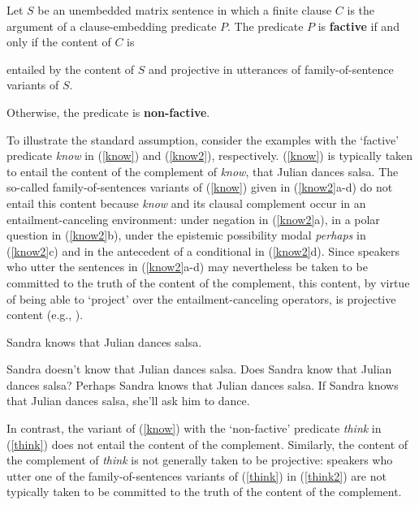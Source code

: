 \documentclass[11pt,fleqn]{article}
\newcommand{\6}{\mbox{$[\hspace*{-.6mm}[$}}
\newcommand{\9}{\mbox{$]\hspace*{-.6mm}]$}}
\begin{document}
\begin{exe}
\ex\label{def} Let $S$ be an unembedded matrix sentence in which a finite clause $C$ is the argument of a clause-embedding predicate $P$. The predicate $P$ is {\bf factive} if and only if the content of $C$ is

\begin{xlist}
\ex entailed by the content of $S$ and
\ex projective in utterances of family-of-sentence variants of $S$.
\end{xlist}
Otherwise, the predicate is {\bf non-factive}.
\end{exe}

To illustrate the standard assumption, consider the examples with the `factive' predicate {\em know} in  (\ref{know}) and (\ref{know2}), respectively. (\ref{know}) is typically taken to entail the content of the complement of {\em know}, that Julian dances salsa. The so-called family-of-sentences variants of (\ref{know}) given in (\ref{know2}a-d) do not entail this content because {\em know} and its clausal complement occur in an entailment-canceling environment: under negation in (\ref{know2}a), in a polar question in (\ref{know2}b), under the epistemic possibility modal {\em perhaps} in (\ref{know2}c) and in the antecedent of a conditional in (\ref{know2}d). Since speakers who utter the sentences in (\ref{know2}a-d) may nevertheless be taken to be committed to the truth of the content of the complement, this content, by virtue of being able to `project' over the entailment-canceling operators, is projective content (e.g., \citealt{potts05,brst-salt10}). 

\begin{exe}

\ex\label{know} Sandra knows that Julian dances salsa.

\ex\label{know2} 

\begin{xlist} 
\ex Sandra doesn't know that Julian dances salsa. 
\ex Does Sandra know that Julian dances salsa?
\ex Perhaps Sandra knows that Julian dances salsa.
\ex If Sandra knows that Julian dances salsa, she'll ask him to dance. 
\end{xlist}

\end{exe}

In contrast, the variant of (\ref{know}) with the `non-factive' predicate {\em think} in (\ref{think}) does not entail the content of the complement.  Similarly, the content of the complement of {\em think} is not generally taken to be projective: speakers who utter one of the family-of-sentences variants of (\ref{think}) in (\ref{think2}) are not typically taken to be committed to the truth of the content of the complement. 
\end{document}
